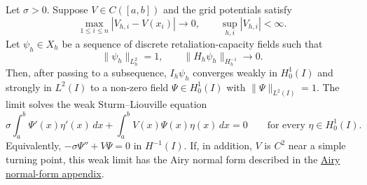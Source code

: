 \begin{theorem}
\label{thm:discrete-cascade-to-airy}
Let $\sigma>0$.  Suppose $V\in C([a,b])$ and the grid potentials satisfy
\[
  \max_{1\le i\le n}|V_{h,i}-V(x_i)|\to 0,
  \qquad
  \sup_{h,i}|V_{h,i}|<\infty .
\]
Let $\psi_h\in X_h$ be a sequence of discrete retaliation-capacity fields such
that
\[
  \|\psi_h\|_{L_h^2}=1,
  \qquad
  \|H_h\psi_h\|_{H_h^{-1}}\to 0 .
\]
Then, after passing to a subsequence, $I_h\psi_h$ converges weakly in
$H_0^1(I)$ and strongly in $L^2(I)$ to a non-zero field
$\Psi\in H_0^1(I)$ with $\|\Psi\|_{L^2(I)}=1$.  The limit solves the weak
Sturm--Liouville equation
\[
  \sigma\int_a^b \Psi'(x)\eta'(x)\,dx
  +
  \int_a^b V(x)\Psi(x)\eta(x)\,dx
  =
  0
  \qquad
  \text{for every }\eta\in H_0^1(I).
  \tag{A.3}
\]
Equivalently, $-\sigma\Psi''+V\Psi=0$ in $H^{-1}(I)$.  If, in addition,
$V$ is $C^2$ near a simple turning point, this weak limit has the Airy normal
form described in the \hyperref[app:airy-normal-form]{Airy normal-form appendix}.
\end{theorem}

